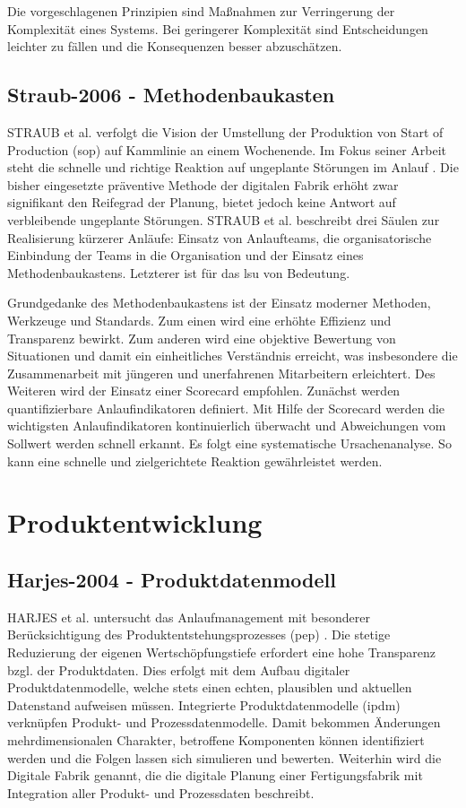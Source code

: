 Die vorgeschlagenen Prinzipien sind Maßnahmen zur Verringerung der Komplexität eines Systems. Bei geringerer Komplexität sind Entscheidungen leichter zu fällen und die Konsequenzen besser abzuschätzen. 

\subsection*{Straub-2006 - Methodenbaukasten}

STRAUB et al. verfolgt die Vision der Umstellung der Produktion von Start of Production (\gls{sop}) 
auf Kammlinie an einem Wochenende. Im Fokus seiner Arbeit steht die schnelle und richtige Reaktion auf ungeplante Störungen im Anlauf \cite{Straub2006}. Die bisher eingesetzte präventive Methode der digitalen Fabrik erhöht zwar signifikant den Reifegrad der Planung, bietet jedoch keine Antwort auf verbleibende ungeplante Störungen. STRAUB et al. beschreibt drei Säulen zur Realisierung kürzerer Anläufe: Einsatz von Anlaufteams, die organisatorische Einbindung der Teams in die Organisation und der Einsatz eines Methodenbaukastens. Letzterer ist für das \gls{lsu} von Bedeutung. 

Grundgedanke des Methodenbaukastens ist der Einsatz moderner Methoden, Werkzeuge und Standards.
Zum einen wird eine erhöhte Effizienz und Transparenz bewirkt. Zum anderen wird eine objektive Bewertung von Situationen und damit ein einheitliches Verständnis erreicht, was insbesondere die Zusammenarbeit mit jüngeren und unerfahrenen Mitarbeitern erleichtert. 
Des Weiteren wird der Einsatz einer Scorecard empfohlen. 
Zunächst werden quantifizierbare Anlaufindikatoren definiert. Mit Hilfe der Scorecard werden die wichtigsten Anlaufindikatoren kontinuierlich überwacht und Abweichungen vom Sollwert werden schnell erkannt. Es folgt eine systematische Ursachenanalyse. So kann eine schnelle und zielgerichtete Reaktion gewährleistet werden. 


\section{Produktentwicklung}
\subsection*{Harjes-2004 - Produktdatenmodell}
HARJES et al. untersucht das Anlaufmanagement mit besonderer Berücksichtigung des Produktentstehungsprozesses (\gls{pep}) \cite{Harjes2004}. 
Die stetige Reduzierung der eigenen Wertschöpfungstiefe erfordert eine hohe Transparenz bzgl. der Produktdaten. Dies erfolgt mit dem Aufbau digitaler Produktdatenmodelle, welche stets einen echten, plausiblen und aktuellen Datenstand aufweisen müssen. 
Integrierte Produktdatenmodelle (\gls{ipdm})
verknüpfen Produkt- und Prozessdatenmodelle. Damit bekommen Änderungen mehrdimensionalen Charakter, betroffene Komponenten können identifiziert werden und die Folgen lassen sich simulieren und bewerten. 
Weiterhin wird die Digitale Fabrik genannt, die die digitale Planung einer Fertigungsfabrik mit Integration aller Produkt- und Prozessdaten beschreibt. 

